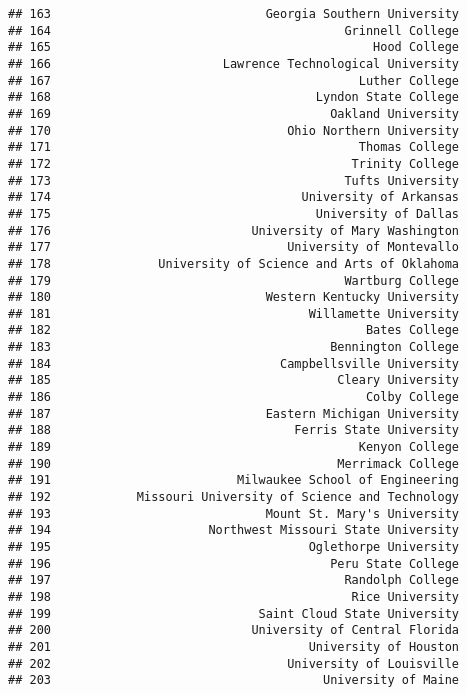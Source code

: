 \documentclass[
]{article}
\begin{document}
\begin{verbatim}
## 163                              Georgia Southern University
## 164                                         Grinnell College
## 165                                             Hood College
## 166                        Lawrence Technological University
## 167                                           Luther College
## 168                                     Lyndon State College
## 169                                       Oakland University
## 170                                 Ohio Northern University
## 171                                           Thomas College
## 172                                          Trinity College
## 173                                         Tufts University
## 174                                   University of Arkansas
## 175                                     University of Dallas
## 176                            University of Mary Washington
## 177                                 University of Montevallo
## 178               University of Science and Arts of Oklahoma
## 179                                         Wartburg College
## 180                              Western Kentucky University
## 181                                    Willamette University
## 182                                            Bates College
## 183                                       Bennington College
## 184                                Campbellsville University
## 185                                        Cleary University
## 186                                            Colby College
## 187                              Eastern Michigan University
## 188                                  Ferris State University
## 189                                           Kenyon College
## 190                                        Merrimack College
## 191                          Milwaukee School of Engineering
## 192            Missouri University of Science and Technology
## 193                              Mount St. Mary's University
## 194                      Northwest Missouri State University
## 195                                    Oglethorpe University
## 196                                       Peru State College
## 197                                         Randolph College
## 198                                          Rice University
## 199                             Saint Cloud State University
## 200                            University of Central Florida
## 201                                    University of Houston
## 202                                 University of Louisville
## 203                                      University of Maine

\end{verbatim}
\end{document}
